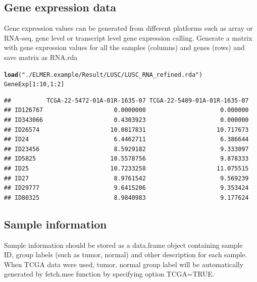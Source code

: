 \documentclass{article}\usepackage[]{graphicx}\usepackage[usenames,dvipsnames]{color}
\makeatletter
\newcommand{\hlnum}[1]{\textcolor[rgb]{0.686,0.059,0.569}{#1}}%
\newcommand{\hlstr}[1]{\textcolor[rgb]{0.192,0.494,0.8}{#1}}%
\newcommand{\hlopt}[1]{\textcolor[rgb]{0,0,0}{#1}}%
\newcommand{\hlstd}[1]{\textcolor[rgb]{0.345,0.345,0.345}{#1}}%
\newcommand{\hlkwd}[1]{\textcolor[rgb]{0.737,0.353,0.396}{\textbf{#1}}}%
\newenvironment{kframe}{%
 \def\at@end@of@kframe{}%
 \ifinner\ifhmode%
  \def\at@end@of@kframe{\end{minipage}}%
  \begin{minipage}{\columnwidth}%
 \fi\fi%
 \def\FrameCommand##1{\hskip\@totalleftmargin \hskip-\fboxsep
 \colorbox{shadecolor}{##1}\hskip-\fboxsep
     \hskip-\linewidth \hskip-\@totalleftmargin \hskip\columnwidth}%
 \MakeFramed {\advance\hsize-\width
   \@totalleftmargin\z@ \linewidth\hsize
   \@setminipage}}%
 {\par\unskip\endMakeFramed%
 \at@end@of@kframe}
\newenvironment{knitrout}{}{} %
\makeatother
\begin{document}
\subsection{Gene expression data}
Gene expression values can be generated from different platforms such as array or 
RNA-seq, gene level or transcript level gene expression calling. Generate a matrix 
with gene expression values for all the samples (columns) and genes (rows) 
and save matrix as RNA.rda

\begin{knitrout}
\color{fgcolor}\begin{kframe}
\begin{alltt}
\hlkwd{load}\hlstd{(}\hlstr{"./ELMER.example/Result/LUSC/LUSC_RNA_refined.rda"}\hlstd{)}
\hlstd{GeneExp[}\hlnum{1}\hlopt{:}\hlnum{10}\hlstd{,} \hlnum{1}\hlopt{:}\hlnum{2}\hlstd{]}
\end{alltt}
\begin{verbatim}
##          TCGA-22-5472-01A-01R-1635-07 TCGA-22-5489-01A-01R-1635-07
## ID126767                    0.0000000                     0.000000
## ID343066                    0.4303923                     0.000000
## ID26574                    10.0817831                    10.717673
## ID24                        6.4462711                     6.386644
## ID23456                     8.5929182                     9.333097
## ID5825                     10.5578756                     9.878333
## ID25                       10.7233258                    11.075515
## ID27                        8.9761542                     9.569239
## ID29777                     9.6415206                     9.353424
## ID80325                     8.9840983                     9.177624
\end{verbatim}
\end{kframe}
\end{knitrout}


\subsection{Sample information}
Sample information should be stored as a data.frame object containing sample ID, 
group labels (such as tumor, normal) and other description for each sample. 
When TCGA data were used, tumor, normal group label will be automatically generated by 
fetch.mee function by specifying option TCGA=TRUE.
\end{document}

